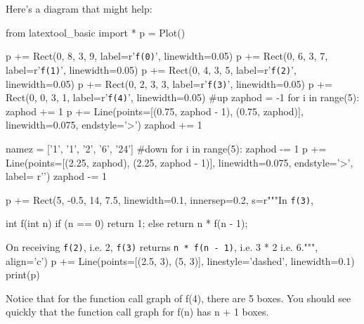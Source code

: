 Here's a diagram that might help:
\begin{python}
from latextool_basic import *
p = Plot()

p += Rect(0, 8, 3, 9, label=r'\texttt{f(0)}', linewidth=0.05)
p += Rect(0, 6, 3, 7, label=r'\texttt{f(1)}', linewidth=0.05)
p += Rect(0, 4, 3, 5, label=r'\texttt{f(2)}', linewidth=0.05)
p += Rect(0, 2, 3, 3, label=r'\texttt{f(3)}', linewidth=0.05)
p += Rect(0, 0, 3, 1, label=r'\texttt{f(4)}', linewidth=0.05)
#up
zaphod = -1
for i in range(5):
    zaphod += 1
    p += Line(points=[(0.75, zaphod - 1), (0.75, zaphod)], linewidth=0.075, endstyle='>')
    zaphod += 1

namez = ['1', '1', '2', '6', '24']
#down
for i in range(5):
    zaphod -= 1
    p += Line(points=[(2.25, zaphod), (2.25, zaphod - 1)], linewidth=0.075, endstyle='>', label= r'')
    zaphod -= 1

p += Rect(5, -0.5, 14, 7.5, linewidth=0.1, innersep=0.2, s=r"""In \texttt{f(3)}, \begin{console}
int f(int n)
{
    if (n == 0)
       return 1;
    else
       return n * f(n - 1); 
}
\end{console}
On receiving \texttt{f(2)}, i.e. 2, \texttt{f(3)} returns \texttt{n * f(n - 1)}, i.e. 3 * 2 i.e. 6.""", align='c')
p += Line(points=[(2.5, 3), (5, 3)], linestyle='dashed', linewidth=0.1)
print(p)
\end{python}


Notice that for the function call graph of f(4), there are 5 boxes. You
should see quickly that the function call graph for f(n) has n + 1
boxes.


